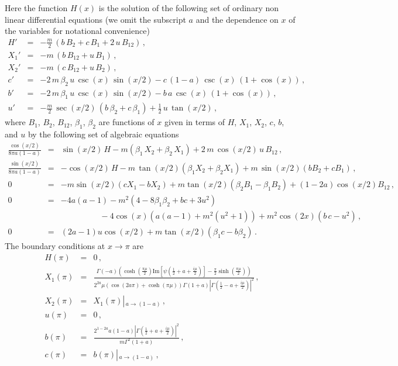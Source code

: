 \documentclass[a4paper]{article}
\begin{document}
Here the function $H(x)$ is the solution of the following set of ordinary non linear differential equations (we omit the subscript $a$ and the dependence on $x$ of the variables for notational convenience)
\begin{eqnarray} 
H' &=& - \frac{m}{2}\,\left( b\,B_2 +c\, B_1 + 2\,u\,B_{12} \right)\label{hprima}\,,\\
X_1' &=& - m\,\left( b\,B_{12}+ u\,B_1 \right)\label{x1prima} \,,\\
X_2' &=& - m\,\left( c\,B_{12} + u\,B_2 \right) \label{x2prima}\,,\\
c' &=&- 2\,m\,\beta_2 \,u\, \csc(x)\,\sin(x/2) - c\,(1 - a)\,\csc(x)\,(1 + \cos(x))\label{cprima}\,, \\
b' &=& -2\,m\,\beta_1\,u\,\csc(x)\,\sin(x/2) - b\,a\,\csc(x)\,(1 + \cos(x)) \label{bprima} \,,\\
u'&=&-\frac{m}{2}\,\sec(x/2)\,(b\,\beta_2+ c\,\beta_1) + \frac{1}{2}\,u\,\tan \left(x/2 \right)\label{uprima} \,,
\end{eqnarray}
where $B_1$, $B_2$, $B_{12}$, $\beta_1$, $\beta_2$ are functions of $x$ given in terms of $H$, $X_1$, $X_2$, $c$, $b$, and $u$ by the following set of algebraic equations
\begin{eqnarray}
\frac{\cos(x/2)}{8 
\pi a(1 - a)}&=&\sin(x/2)\,H - m \left(\beta_1\, X_2 + \beta_2\, X_1\right) + 2\,m\,\cos(x/2)\, u\, B_{12}\,,\label{29} \\
\frac{\sin(x/2)}{8 \pi a(1 - a)}&=&-\cos(x/2)\,H - m\, \tan(x/2)\left(\beta_1 X_2 + \beta_2 X_1 \right) + 
  m\,\sin(x/2)(b B_2 + c B_1) \,,\label{30}\\
0&=& -m \sin(x/2)(c X_1
 -b X_2) + m \tan(x/2)(\beta_2 B_1- \beta_1 B_2)+(1-2a)\cos(x/2) B_{12}\,,\label{31}\\
0&=&-4a(a - 1) - m^2(4 - 8\beta_1\beta_2 + b c + 3u^2) \nonumber\\&&\hspace{2cm}- 
      4\cos(x)\left(a(a - 1) + m^2(u^2 + 1)\right) 
      + m^2\cos(2x)(b\,c - u^2) \label{4a}\,,\\
0&=&(2a - 1)u\cos(x/2)+m \tan(x/2)(\beta_1 c - b \beta_2)\,.\label{minuscula}
\end{eqnarray}
The boundary conditions at $x\rightarrow\pi$ are
\begin{eqnarray}
H(\pi)&=&0\,,\\
X_1(\pi)&=&\frac{ \Gamma(-a) \left( \cosh \left( \frac{\pi \mu}{2} \right) \textrm{Im} \left[ \psi \left( \frac{1}{2} + a + \frac{i\mu}{2} \right) \right] - \frac{\pi}{2} \sinh \left( \frac{\pi\mu}{2} \right)   \right)}{2^{2a}\mu  \left( \cos \left( 2 a \pi\right)+\cosh (\pi \mu)\right) \Gamma (1+a) \left| \Gamma \left( \frac{1}{2}-a+\frac{i\mu}{2}\right) \right|^2 }\,,\label{xx1}\\
X_2(\pi)&=&X_1(\pi)\left|_{\,a\rightarrow (1-a)} \right. \,,\label{xx2} \\
u(\pi)&=&0\,, \label{upi}\\
b	(\pi)&=&\frac{ 2^{1-2a} a (1-a) \left| \Gamma\left( \frac{1}{2} +a+\frac{i\mu}{2}\right)\right|^2}{m\Gamma^2 (1+a)}\,,\label{treintaytres}\\
c(\pi)&=&b(\pi)\left|_{\,a\rightarrow (1-a)}\right.  \,,\label{treintaydos}
\end{eqnarray}
\end{document}
